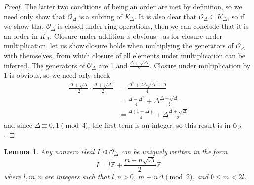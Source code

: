 \documentclass[honours,12pt]{unswthesis}
\newcommand{\Z}{\mathbb{Z}} %
\newcommand{\order}{\mathcal{O}} %
\newtheorem{lemma}[theorem]{Lemma}
\numberwithin{equation}{section}
\begin{document}
\begin{proof}
    The latter two conditions of being an order are met by definition, so we need only show that $\order_\Delta$ is a subring of $K_\Delta$. 
    It is also clear that $\order_\Delta \subseteq K_\Delta$, so if we show that $\order_\Delta$ is closed under ring operations, then we can conclude that it is an order in $K_\Delta$.
    Closure under addition is obvious - as for closure under multiplication, let us show closure holds when multiplying the generators of $\order_\Delta$ with themselves, from which closure of all elements under multiplication can be inferred.
    The generators of $\order_\Delta$ are 1 and $\frac{\Delta + \sqrt\Delta}{2}$.
    Closure under multiplication by 1 is obvious, so we need only check
    \begin{align*}
        \frac{\Delta + \sqrt\Delta}{2} \cdot \frac{\Delta + \sqrt\Delta}{2} &= \frac{\Delta^2 + 2\Delta\sqrt\Delta + \Delta}{4} \\
        &= \frac{\Delta - \Delta^2}{4} + \Delta\frac{\Delta + \sqrt\Delta}{2} \\
        &= \frac{\Delta (1 - \Delta)}{4} + \Delta\frac{\Delta + \sqrt\Delta}{2}
    \end{align*}
    and since $\Delta \equiv 0, 1 \pmod{4}$, the first term is an integer, so this result is in $\order_\Delta$.
\end{proof}

\begin{lemma}\label{lemma-ideal-lattice}
    Any nonzero ideal $I \trianglelefteq \order_\Delta$ can be uniquely written in the form
    $$I = l\Z + \frac{m + n\sqrt\Delta}{2}\Z$$
    where $l, m, n$ are integers such that $l, n > 0$, $m \equiv n\Delta \pmod{2}$, and $0 \leq m < 2l$.
\end{lemma}
\end{document}
